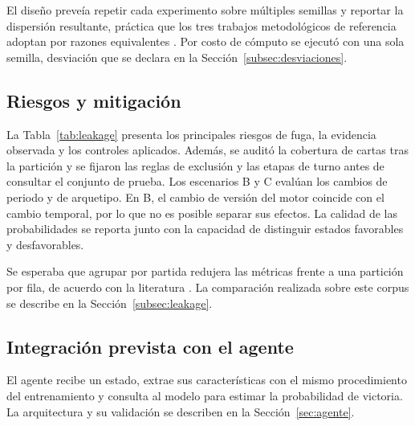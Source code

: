 El diseño preveía repetir cada experimento sobre múltiples semillas y
reportar la dispersión resultante, práctica que los tres trabajos
metodológicos de referencia adoptan por razones equivalentes
\cite{grinsztajn_trees_2022,figueiredo_leakage_2024,brill_winprob_2026}. Por
costo de cómputo se ejecutó con una sola semilla, desviación que se declara
en la Sección~\ref{subsec:desviaciones}.

\subsection{Riesgos y mitigación}
\label{subsec:riesgos}

La Tabla~\ref{tab:leakage} presenta los principales riesgos de fuga,
la evidencia observada y los controles aplicados. Además, se auditó la
cobertura de cartas tras la partición y se fijaron las reglas de exclusión
y las etapas de turno antes de consultar el conjunto de prueba. Los
escenarios B y C evalúan los cambios de periodo y de arquetipo. En B, el
cambio de versión del motor coincide con el cambio temporal, por lo que no
es posible separar sus efectos. La calidad de las probabilidades se reporta
junto con la capacidad de distinguir estados favorables y desfavorables.

Se esperaba que agrupar por partida redujera las métricas frente a una
partición por fila, de acuerdo con la literatura
\cite{figueiredo_leakage_2024,karbalaie_participantaware_2026}. La
comparación realizada sobre este corpus se describe en la
Sección~\ref{subsec:leakage}.

\subsection{Integración prevista con el agente}
\label{subsec:agente}

El agente recibe un estado, extrae sus características con el mismo
procedimiento del entrenamiento y consulta al modelo para estimar la
probabilidad de victoria. La arquitectura y su validación se describen en
la Sección~\ref{sec:agente}.
